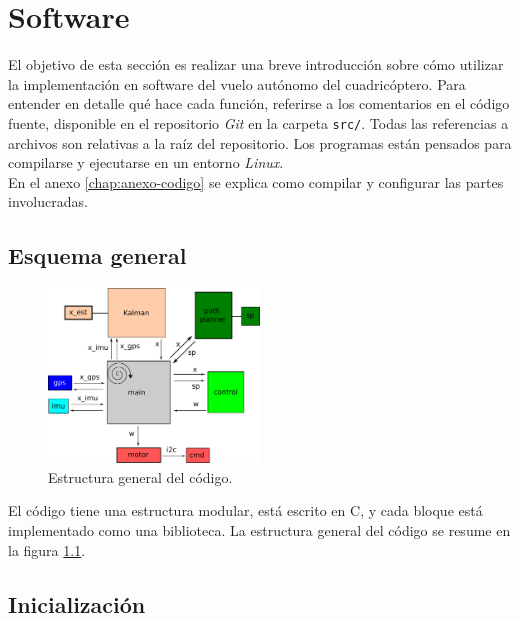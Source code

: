 \documentclass[main]{subfiles}
\begin{document}
\chapter{Software}
\label{chap:Software}

El objetivo de esta sección es realizar una breve introducción sobre cómo utilizar la implementaci\'on en software del vuelo autónomo del cuadricóptero. Para entender en detalle qué hace cada función, referirse a los comentarios en el código fuente, disponible en el repositorio \textit{Git} en la carpeta \verb+src/+. Todas las referencias a archivos son relativas a la raíz del repositorio. Los programas están pensados para compilarse y ejecutarse en un entorno \emph{Linux}.\\

En el anexo \ref{chap:anexo-codigo} se explica como compilar y configurar las partes involucradas.

\section{Esquema general}
\label{sec:software:esquema-general}

\begin{figure}
\vspace{-20pt}
\centering
  \includegraphics[width=0.5\textwidth]{./pics_codigo/code.png}
\caption{Estructura general del código.}
\vspace{-20pt}
\label{fig:codigo:code.png}
\end{figure}

El código tiene una estructura modular, está escrito en C, y cada bloque está implementado como una biblioteca. La estructura general del código se resume en la figura \ref{fig:codigo:code.png}.

\section{Inicializaci\'on}
\label{sec:software-init}
\end{document}
